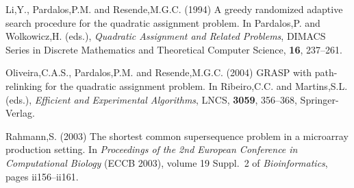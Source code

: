 \documentclass[english]{lni}
\newcommand{\ignore}[1]{}
\begin{document}
\begin{thebibliography}{9}
\ignore{
\bibitem{KOOPMANS57} Koopmans,T.C. and
Beckmann,M.J. (1957) Assignment problems and the location of economic
activities. {\it Econometrica}, {\bf 25}, 53--76.
}

 Li,Y., Pardalos,P.M. and Resende,M.G.C.
(1994) A greedy randomized adaptive search procedure for the quadratic
assignment problem. In Pardalos,P. and Wolkowicz,H. (eds.), {\it Quadratic
Assignment and Related Problems}, DIMACS Series in Discrete Mathematics and
Theoretical Computer Science, {\bf 16}, 237--261.

 Oliveira,C.A.S., Pardalos,P.M.
and Resende,M.G.C. (2004) GRASP with path-relinking for the quadratic assignment
problem. In Ribeiro,C.C. and Martins,S.L. (eds.), {\it Efficient and
Experimental Algorithms}, LNCS, {\bf 3059},
356--368, Springer-Verlag.

Rahmann,S. (2003) The shortest common supersequence problem in a microarray
production setting. In {\it Proceedings of the 2nd European Conference in
Computational Biology} ({ECCB} 2003), volume 19 Suppl.~2 of
{\it Bioinformatics}, pages ii156--ii161.

\end{thebibliography}
\end{document}
